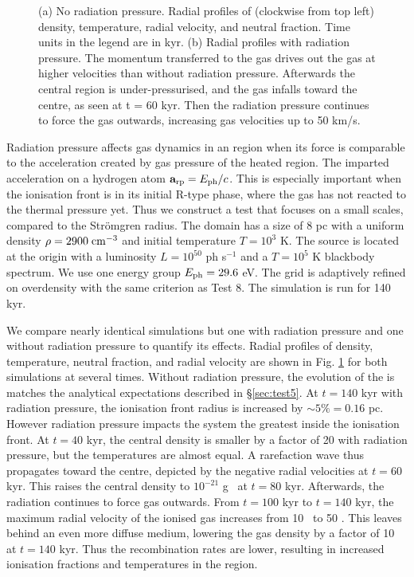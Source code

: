 \documentclass[useAMS,usenatbib]{mn2e}
\begin{document}
\begin{figure}
  \caption{\label{fig:rp_profiles} (a) No radiation pressure.
    Radial profiles of (clockwise from top left) density, temperature,
    radial velocity, and neutral fraction.  Time units in the legend
    are in kyr.  (b) Radial profiles with radiation pressure.  The
    momentum transferred to the gas drives out the gas at higher
    velocities than without radiation pressure.  Afterwards the
    central region is under-pressurised, and the gas infalls toward the
    centre, as seen at t = 60 kyr.  Then the radiation pressure
    continues to force the gas outwards, increasing gas velocities up
    to 50 km/s.}
\end{figure}

Radiation pressure affects gas dynamics in an \hii region when
its force is comparable to the acceleration created by gas pressure of
the heated region.  The imparted acceleration on a hydrogen atom
$\mathbf{a}_{\rm rp} = E_{\rm ph}/c$.  This is especially important
when the ionisation front is in its initial R-type phase, where the
gas has not reacted to the thermal pressure yet.  Thus we construct a
test that focuses on a small scales, compared to the Str\"{o}mgren
radius.  The domain has a size of 8 pc with a uniform density $\rho =
2900\;\cubecm$ and initial temperature $T = 10^3$ K.  The source is
located at the origin with a luminosity $L = 10^{50}$ ph s$^{-1}$ and
a $T=10^5$ K blackbody spectrum.  We use one energy group $E_{\rm ph}
= 29.6$ eV.  The grid is adaptively refined on overdensity with the
same criterion as Test 8.  The simulation is run for 140 kyr.

We compare nearly identical simulations but one with radiation
pressure and one without radiation pressure to quantify its effects.
Radial profiles of density, temperature, neutral fraction, and radial
velocity are shown in Fig. \ref{fig:rp_profiles} for both
simulations at several times.  Without radiation pressure, the
evolution of the \hii is matches the analytical expectations
described in \S\ref{sec:test5}.  At $t=140$ kyr with radiation
pressure, the ionisation front radius is increased by $\sim5\% = 0.16$
pc.  However radiation pressure impacts the system the greatest inside
the ionisation front.  At $t = 40$ kyr, the central density is smaller
by a factor of 20 with radiation pressure, but the temperatures are
almost equal.  A rarefaction wave thus propagates toward the centre,
depicted by the negative radial velocities at $t = 60$ kyr.  This
raises the central density to $10^{-21}$ g \cubecm~at $t = 80$ kyr.
Afterwards, the radiation continues to force gas outwards.  From $t =
100$ kyr to $t = 140$ kyr, the maximum radial velocity of the ionised
gas increases from 10 \kms~to 50 \kms.  This leaves behind an even
more diffuse medium, lowering the gas density by a factor of 10 at $t
= 140$ kyr.  Thus the recombination rates are lower, resulting in
increased ionisation fractions and temperatures in the \hii
region.
\end{document}
